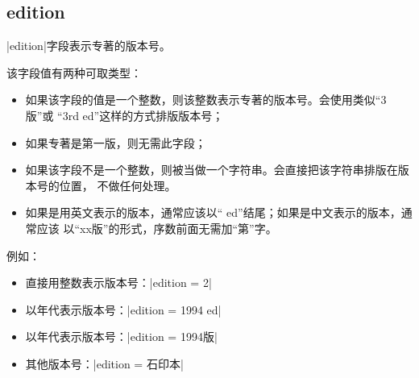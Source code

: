 
\subsection{edition}\label{subsec:bibfield-edition}

|edition|字段表示专著的版本号。

该字段值有两种可取类型：
\begin{itemize}
\item 如果该字段的值是一个整数，则该整数表示专著的版本号。{\BibTeX}会使用类似``3版''或
``3rd ed''这样的方式排版版本号；
\item 如果专著是第一版，则无需此字段；
\item 如果该字段不是一个整数，则被当做一个字符串。{\BibTeX}会直接把该字符串排版在版本号的位置，
不做任何处理。
\item 如果是用英文表示的版本，通常应该以`` ed''结尾；如果是中文表示的版本，通常应该
以``xx版''的形式，序数前面无需加``第''字。
\end{itemize}

例如：
\begin{itemize}
\item 直接用整数表示版本号：|edition = {2}|
\item 以年代表示版本号：|edition = {1994 ed}|
\item 以年代表示版本号：|edition = {1994版}|
\item 其他版本号：|edition = {石印本}|
\end{itemize}
